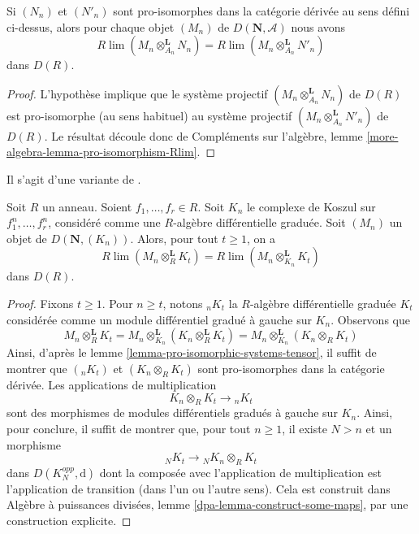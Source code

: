 \begin{lemma}
\label{lemma-pro-isomorphic-systems-tensor} Si
$(N_n)$ et $(N'_n)$ sont pro-isomorphes dans la catégorie dérivée au sens
défini ci-dessus,
alors pour chaque objet $(M_n)$ de $D(\mathbf{N}, \mathcal{A})$ nous avons
$$
R\lim (M_n \otimes_{A_n}^\mathbf{L} N_n) =
R\lim (M_n \otimes_{A_n}^\mathbf{L} N'_n)
$$
dans $D(R)$.
\end{lemma}

\begin{proof}
L'hypothèse implique que le système projectif
$(M_n \otimes_{A_n}^\mathbf{L} N_n)$ de $D(R)$ est pro-isomorphe (au sens
habituel) au système projectif
$(M_n \otimes_{A_n}^\mathbf{L} N'_n)$ de $D(R)$. Le résultat découle
donc de Compléments
sur l'algèbre, lemme \ref{more-algebra-lemma-pro-isomorphism-Rlim}.
\end{proof}

\begin{lemma}
\label{lemma-different-tensors}
\begin{reference} Il
s'agit d'une variante de \cite[Lemma 3.5.4]{BS}.
\end{reference}
Soit $R$ un anneau. Soient $f_1, \ldots, f_r \in R$.
Soit $K_n$ le complexe de Koszul sur $f_1^n, \ldots, f_r^n$,
considéré comme une $R$-algèbre différentielle
graduée. Soit $(M_n)$ un objet de $D(\mathbf{N}, (K_n))$.
Alors, pour tout $t \geq 1$, on
a $$
R\lim (M_n \otimes_R^\mathbf{L} K_t) =
R\lim (M_n \otimes_{K_n}^\mathbf{L} K_t)
$$
dans $D(R)$.
\end{lemma}

\begin{proof}
Fixons $t \geq 1$. Pour $n \geq t$, notons ${}_nK_t$
la $R$-algèbre différentielle graduée $K_t$ considérée comme un module différentiel gradué
à gauche sur $K_n$. Observons que
$$
M_n \otimes_R^\mathbf{L} K_t =
M_n \otimes_{K_n}^\mathbf{L} (K_n \otimes_R^\mathbf{L} K_t) =
M_n \otimes_{K_n}^\mathbf{L} (K_n \otimes_R K_t)
$$
Ainsi, d'après le lemme \ref{lemma-pro-isomorphic-systems-tensor},
il suffit de montrer que
$({}_nK_t)$ et $(K_n \otimes_R K_t)$ sont pro-isomorphes dans la
catégorie dérivée. Les applications de multiplication
$$
K_n \otimes_R K_t \longrightarrow {}_nK_t
$$
sont des morphismes de modules différentiels gradués à gauche sur $K_n$. Ainsi, pour conclure,
il suffit de montrer que, pour tout $n \geq 1$, il existe $N > n$
et un morphisme
$$
{}_NK_t \longrightarrow {}_NK_n \otimes_R K_t
$$
dans $D(K_N^{opp}, \text{d})$ dont la composée avec l'application de multiplication
est l'application de transition (dans l'un ou l'autre sens). Cela est construit dans
Algèbre à puissances divisées, lemme \ref{dpa-lemma-construct-some-maps},
par une construction explicite.
\end{proof}

